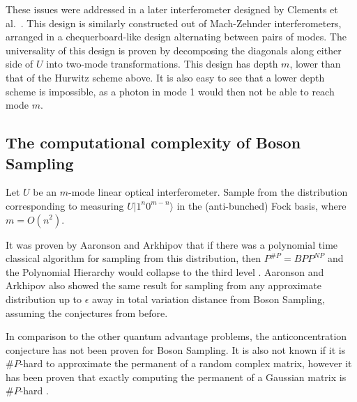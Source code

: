 These issues were addressed in a later interferometer designed by Clements et al.~\cite{clements2016}. This design is similarly constructed out of Mach-Zehnder interferometers, arranged in a chequerboard-like design alternating between pairs of modes. The universality of this design is proven by decomposing the diagonals along either side of $U$ into two-mode transformations. This design has depth $m$, lower than that of the Hurwitz scheme above. It is also easy to see that a lower depth scheme is impossible, as a photon in mode 1 would then not be able to reach mode $m$.

\subsection{The computational complexity of Boson Sampling}
\label{ssec:cc-bs}

\begin{problem} Let $U$ be an $m$-mode linear optical interferometer. Sample from the distribution corresponding to measuring $U|1^n0^{m-n}\rangle$ in the (anti-bunched) Fock basis, where $m=O(n^2)$.
\end{problem}

It was proven by Aaronson and Arkhipov that if there was a polynomial time classical algorithm for sampling from this distribution, then $P^{\#P} = BPP^{NP}$ and the Polynomial Hierarchy would collapse to the third level \cite{aaronson2010, aaronson2010}. 
Aaronson and Arkhipov also showed the same result for sampling from any approximate distribution up to $\epsilon$ away in total variation distance from Boson Sampling, assuming the conjectures from before.

In comparison to the other quantum advantage problems, the anticoncentration conjecture has not been proven for Boson Sampling. It is also not known if it is $\#P$-hard to approximate the permanent of a random complex matrix, however it has been proven that exactly computing the permanent of a Gaussian matrix is $\#P$-hard \cite{aaronson2010, aaronson2010}.

